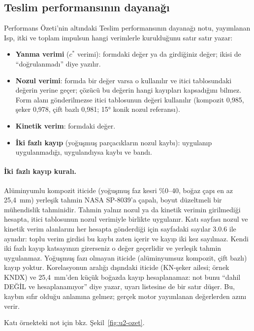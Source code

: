 \documentclass[11pt,a4paper]{article}
\newcommand{\ui}[1]{\textsf{#1}}
\begin{document}
\subsection{Teslim performansının dayanağı}\label{sec:kati-dayanak}

Performans Özeti'nin altındaki \ui{Teslim performansının dayanağı} notu,
yayımlanan Isp, itki ve toplam impulsun hangi verimlerle kurulduğunu satır
satır yazar:

\begin{itemize}[leftmargin=1.4em]
  \item \textbf{Yanma verimi} ($c^*$ verimi): formdaki değer ya da girdiğiniz
  değer; ikisi de ``doğrulanmadı'' diye yazılır.
  \item \textbf{Nozul verimi}: formda bir değer varsa o kullanılır ve itici
  tablosundaki değerin yerine geçer; çözücü bu değerin hangi kayıpları
  kapsadığını bilmez. Form alanı gönderilmezse itici tablosunun değeri
  kullanılır (kompozit 0,985, şeker 0,978, çift bazlı 0,981; 15° konik nozul
  referansı).
  \item \textbf{Kinetik verim}: formdaki değer.
  \item \textbf{İki fazlı kayıp} (yoğuşmuş parçacıkların nozul kaybı): uygulanıp
  uygulanmadığı, uygulandıysa kaybı ve bandı.
\end{itemize}

\paragraph{İki fazlı kayıp kuralı.} Alüminyumlu kompozit iticide (yoğuşmuş faz
kesri \%0--40, boğaz çapı en az 25,4~mm) yerleşik tahmin NASA SP-8039'a
çapalı, boyut düzeltmeli bir mühendislik tahminidir. Tahmin yalnız nozul ya da
kinetik verimin girilmediği hesapta, itici tablosunun nozul verimiyle birlikte
uygulanır. Katı sayfası nozul ve kinetik verim alanlarını her hesapta
gönderdiği için sayfadaki sayılar 3.0.6 ile aynıdır: toplu verim girdisi bu
kaybı zaten içerir ve kayıp iki kez sayılmaz. Kendi iki fazlı kayıp
katsayınızı girerseniz o değer geçerlidir ve yerleşik tahmin uygulanmaz.
Yoğuşmuş fazı olmayan iticide (alüminyumsuz kompozit, çift bazlı) kayıp
yoktur. Korelasyonun aralığı dışındaki iticide (KN-şeker ailesi; örnek KNDX)
ve 25,4~mm'den küçük boğazda kayıp hesaplanamaz: not bunu ``dahil DEĞİL ve
hesaplanamıyor'' diye yazar, uyarı listesine de bir satır düşer. Bu, kaybın
sıfır olduğu anlamına gelmez; gerçek motor yayımlanan değerlerden azını verir.

Katı örnekteki not için bkz. Şekil~\ref{fig:u2-ozet}.
\end{document}
